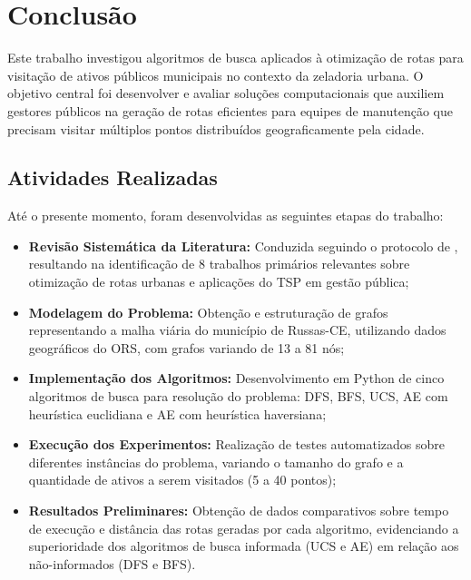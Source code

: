 \chapter{Conclusão}
\label{chap:conclusoes-e-trabalhos-futuros}

Este trabalho investigou algoritmos de busca aplicados à otimização de rotas para visitação de 
ativos públicos municipais no contexto da zeladoria urbana. O objetivo central foi desenvolver e 
avaliar soluções computacionais que auxiliem gestores públicos na geração de rotas eficientes para 
equipes de manutenção que precisam visitar múltiplos pontos distribuídos geograficamente pela cidade.

\section{Atividades Realizadas}

Até o presente momento, foram desenvolvidas as seguintes etapas do trabalho:

\begin{itemize}
    \item \textbf{Revisão Sistemática da Literatura:} Conduzida seguindo o protocolo de 
    , resultando na identificação de 8 trabalhos primários relevantes 
    sobre otimização de rotas urbanas e aplicações do \gls{TSP} em gestão pública;
    
    \item \textbf{Modelagem do Problema:} Obtenção e estruturação de grafos representando a malha 
    viária do município de Russas-CE, utilizando dados geográficos do \gls{ORS}, com grafos 
    variando de 13 a 81 nós;
    
    \item \textbf{Implementação dos Algoritmos:} Desenvolvimento em Python de cinco algoritmos de 
    busca para resolução do problema: \gls{DFS}, \gls{BFS}, \gls{UCS}, \gls{AE} com heurística 
    euclidiana e \gls{AE} com heurística haversiana;
    
    \item \textbf{Execução dos Experimentos:} Realização de testes automatizados sobre diferentes 
    instâncias do problema, variando o tamanho do grafo e a quantidade de ativos a serem visitados 
    (5 a 40 pontos);
    
    \item \textbf{Resultados Preliminares:} Obtenção de dados comparativos sobre tempo de execução 
    e distância das rotas geradas por cada algoritmo, evidenciando a superioridade dos algoritmos 
    de busca informada (\gls{UCS} e \gls{AE}) em relação aos não-informados (\gls{DFS} e \gls{BFS}).
\end{itemize}

